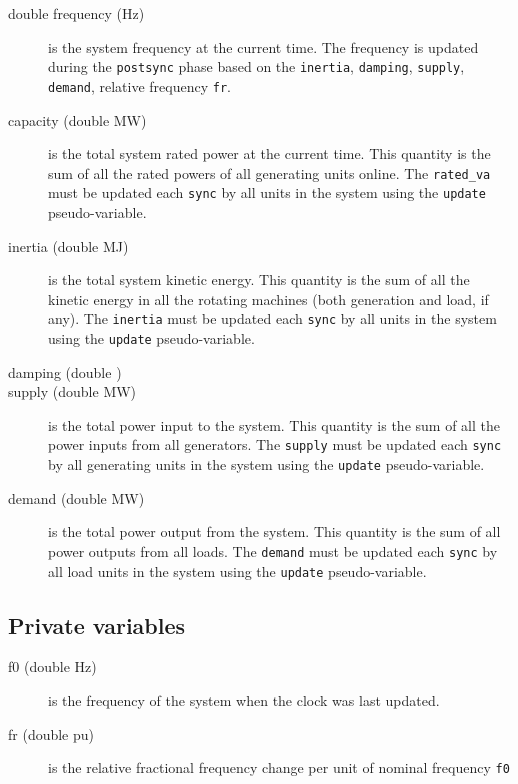 \begin{description}

\item[double frequency (Hz)] is the system frequency at the current time.  The frequency is updated during the \texttt{postsync} phase based on the \texttt{inertia}, \texttt{damping}, \texttt{supply}, \texttt{demand}, relative frequency \texttt{fr}.

\item[capacity (double MW)] is the total system rated power at the current time. This quantity is the sum of all the rated powers of all generating units online. The \texttt{rated\_va} must be updated each \texttt{sync} by all units in the system using the \texttt{update} pseudo-variable.

\item[inertia (double MJ)] is the total system kinetic energy.  This quantity is the sum of all the kinetic energy in all the rotating machines (both generation and load, if any). The \texttt{inertia} must be updated each \texttt{sync} by all units in the system using the \texttt{update} pseudo-variable.

\item[damping (double )] 

\item[supply (double MW)] is the total power input to the system.  This quantity is the sum of all the power inputs from all generators.  The \texttt{supply} must be updated each \texttt{sync} by all generating units in the system using the \texttt{update} pseudo-variable.

\item[demand (double MW)] is the total power output from the system. This quantity is the sum of all power outputs from all loads.  The \texttt{demand} must be updated each \texttt{sync} by all load units in the system using the \texttt{update} pseudo-variable.

\end{description}

\subsection{Private variables}

\begin{description}
\item[f0 (double Hz)] is the frequency of the system when the clock was last updated.
\item[fr (double pu)] is the relative fractional frequency change per unit of nominal frequency \texttt{f0}
\end{description}

